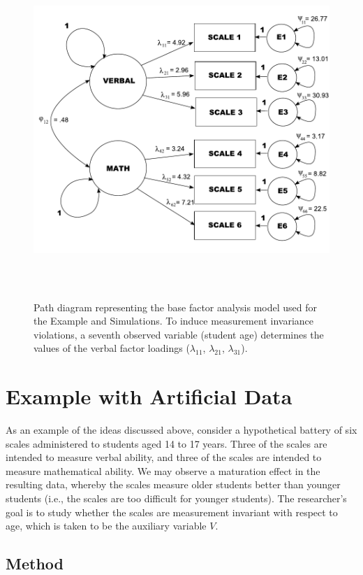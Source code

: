\documentclass[man]{apa}
\begin{document}
\begin{figure}
\caption{Path diagram representing the base factor analysis model used for
  the Example and Simulations.  To induce measurement invariance
  violations, a seventh observed variable (student age) determines the
values of the verbal factor loadings ($\lambda_{11}$, $\lambda_{21}$,
$\lambda_{31}$).}
\label{fig:famod}
\includegraphics[height=5in]{famod.pdf}
%
\end{figure}

\section{Example with Artificial Data}

As an example of the ideas discussed above, consider a
hypothetical battery of six scales administered to students aged 14 to 17
years.  Three of the scales are intended to measure verbal ability, and
three of the scales are intended to measure mathematical ability.  We
may observe a maturation effect in the resulting data, whereby the scales
measure older students better than younger students (i.e., the scales
are too difficult for younger students).  The researcher's goal is to
study whether the scales are measurement invariant with
respect to age, which is taken to be the auxiliary variable $V$.

\subsection{Method}
\end{document}
